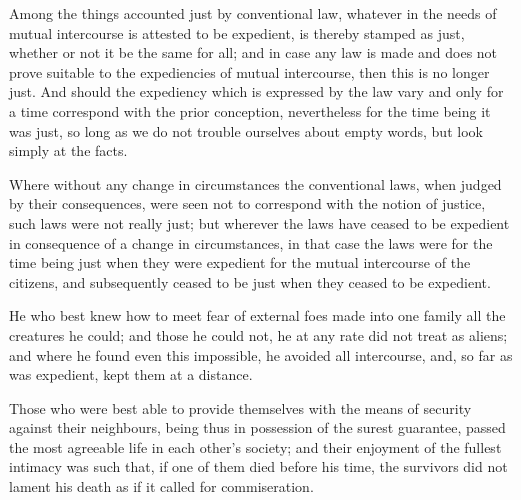 \documentclass{stex}
\begin{document}
\vspace{0.5em}
\begin{sparagraph}[title=37]
  Among the things accounted just by conventional law, whatever in the needs of mutual intercourse is attested to be expedient, is thereby stamped as just, whether or not it be the same for all; and in case any law is made and does not prove suitable to the expediencies of mutual intercourse, then this is no longer just.
  And should the expediency which is expressed by the law vary and only for a time correspond with the prior conception, nevertheless for the time being it was just, so long as we do not trouble ourselves about empty words, but look simply at the facts.
\end{sparagraph}

\vspace{0.5em}
\begin{sparagraph}[title=38]
  Where without any change in circumstances the conventional laws, when judged by their consequences, were seen not to correspond with the notion of justice, such laws were not really just; but wherever the laws have ceased to be expedient in consequence of a change in circumstances, in that case the laws were for the time being just when they were expedient for the mutual intercourse of the citizens, and subsequently ceased to be just when they ceased to be expedient.
\end{sparagraph}

\vspace{0.5em}
\begin{sparagraph}[title=39]
  He who best knew how to meet fear of external foes made into one family all the creatures he could; and those he could not, he at any rate did not treat as aliens; and where he found even this impossible, he avoided all intercourse, and, so far as was expedient, kept them at a distance.
\end{sparagraph}

\vspace{0.5em}
\begin{sparagraph}[title=40]
  Those who were best able to provide themselves with the means of security against their neighbours, being thus in possession of the surest guarantee, passed the most agreeable life in each other's society; and their enjoyment of the fullest intimacy was such that, if one of them died before his time, the survivors did not lament his death as if it called for commiseration.
\end{sparagraph}
\end{document}
